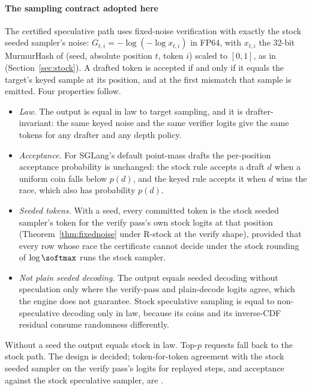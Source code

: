 \paragraph{The sampling contract adopted here} The certified speculative path uses fixed-noise verification with exactly the stock seeded sampler's noise: $G_{t,i}=-\log(-\log x_{t,i})$ in FP64, with $x_{t,i}$ the 32-bit MurmurHash of (seed, absolute position $t$, token $i$) scaled to $[0,1]$, as in  (Section~\ref{sec:stock}). A drafted token is accepted if and only if it equals the target's keyed sample at its position, and at the first mismatch that sample is emitted. Four properties follow.
\begin{itemize}
\item \emph{Law.} The output is equal in law to target sampling, and it is drafter-invariant: the same keyed noise and the same verifier logits give the same tokens for any drafter and any depth policy.
\item \emph{Acceptance.} For SGLang's default point-mass drafts the per-position acceptance probability is unchanged: the stock rule accepts a draft $d$ when a uniform coin falls below $p(d)$, and the keyed rule accepts it when $d$ wins the race, which also has probability $p(d)$.
\item \emph{Seeded tokens.} With a seed, every committed token is the stock seeded sampler's token for the verify pass's own stock logits at that position (Theorem~\ref{thm:fixednoise} under R-stock at the verify shape), provided that every row whose race the certificate cannot decide under the stock rounding of $\log\softmax$ runs the stock sampler.
\item \emph{Not plain seeded decoding.} The output equals seeded decoding without speculation only where the verify-pass and plain-decode logits agree, which the engine does not guarantee. Stock speculative sampling is equal to non-speculative decoding only in law, because its coins and its inverse-CDF residual consume randomness differently.
\end{itemize}
Without a seed the output equals stock in law. Top-$p$ requests fall back to the stock path. The design is decided; token-for-token agreement with the stock seeded sampler on the verify pass's logits for replayed steps, and acceptance against the stock speculative sampler, are .

